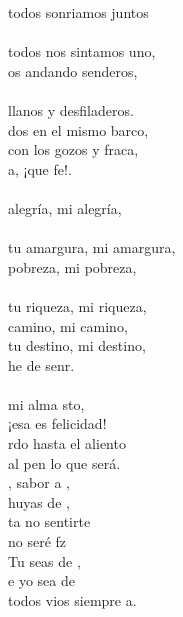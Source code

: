 \begin{cancion}%
	 todos sonriamos juntos\\
	\jump\\
todos nos sintamos uno,\\
	os andando senderos,\\
	\jump\\
llanos y desfiladeros.\\
	dos en el mismo barco,\\
	con los gozos y fraca,\\
	a, ¡que fe!. \\
	\jump\\
	alegría, mi alegría,\\
	\jump\\
tu amargura, mi amargura,\\
	pobreza, mi pobreza,\\
	\jump\\
tu riqueza, mi riqueza,\\
	 camino, mi camino,\\
	tu destino, mi destino,\\
	he de senr.\\
	\jump\\
	mi alma sto,\\
	¡esa es felicidad!\\
	rdo hasta el aliento\\
	al pen lo que será.\\
	, sabor a ,\\
	 huyas de ,\\
	ta no sentirte\\
	no seré fz\\
	 Tu seas de ,\\
	e yo sea de \\
	 todos vios siempre a.\\
\end{cancion}%

